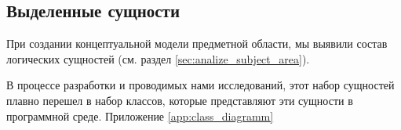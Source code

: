 \subsection{Выделенные сущности}
При создании концептуальной модели предметной области, мы выявили состав
логических сущностей (см. раздел \ref{sec:analize_subject_area}).

В процессе разработки и  проводимых нами исследований, этот набор сущностей плавно
перешел в набор классов, которые представляют эти сущности в программной среде.
Приложение \ref{app:class_diagramm}
